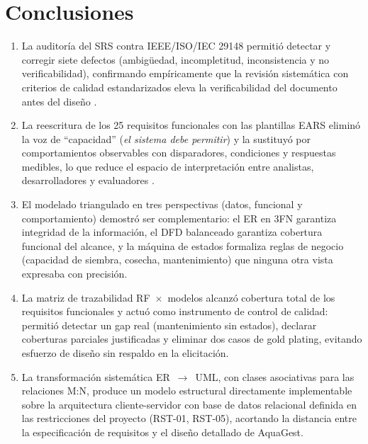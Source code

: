 \documentclass[11pt,a4paper]{article}
\renewcommand{\_}{\textunderscore\allowbreak}
\begin{document}
\section{Conclusiones}
\begin{enumerate}[leftmargin=1.6em]
  \item La auditoría del SRS contra IEEE/ISO/IEC 29148 permitió detectar y corregir siete defectos (ambigüedad, incompletitud, inconsistencia y no verificabilidad), confirmando empíricamente que la revisión sistemática con criterios de calidad estandarizados eleva la verificabilidad del documento antes del diseño \cite{ieee29148,mendez2021}.
  \item La reescritura de los 25 requisitos funcionales con las plantillas EARS eliminó la voz de ``capacidad'' (\textit{el sistema debe permitir}) y la sustituyó por comportamientos observables con disparadores, condiciones y respuestas medibles, lo que reduce el espacio de interpretación entre analistas, desarrolladores y evaluadores \cite{mavin2009}.
  \item El modelado triangulado en tres perspectivas (datos, funcional y comportamiento) demostró ser complementario: el ER en 3FN garantiza integridad de la información, el DFD balanceado garantiza cobertura funcional del alcance, y la máquina de estados formaliza reglas de negocio (capacidad de siembra, cosecha, mantenimiento) que ninguna otra vista expresaba con precisión.
  \item La matriz de trazabilidad RF~$\times$~modelos alcanzó cobertura total de los requisitos funcionales y actuó como instrumento de control de calidad: permitió detectar un gap real (mantenimiento sin estados), declarar coberturas parciales justificadas y eliminar dos casos de gold plating, evitando esfuerzo de diseño sin respaldo en la elicitación.
  \item La transformación sistemática ER~$\rightarrow$~UML, con clases asociativas para las relaciones M:N, produce un modelo estructural directamente implementable sobre la arquitectura cliente-servidor con base de datos relacional definida en las restricciones del proyecto (RST-01, RST-05), acortando la distancia entre la especificación de requisitos y el diseño detallado de AquaGest.
\end{enumerate}



\end{document}
